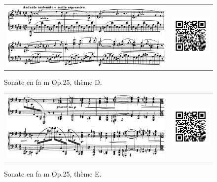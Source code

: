 \begin{figure}[!p]
  \begin{bigcenter}
    \begin{tabular}{lr}
      \includegraphics[width=12.5cm, keepaspectratio]{sonate-theme-D.png}
      &
      \includegraphics[width=3cm, keepaspectratio]{op1-qr.png}
    \end{tabular}
  \end{bigcenter}
  \caption{\label{sonate-theme-4}Sonate en fa m Op.25, thème D.}
\end{figure}

\begin{figure}[!p]
  \begin{bigcenter}
    \begin{tabular}{lr}
      \includegraphics[width=12.5cm, keepaspectratio]{sonate-theme-E.png}
      &
      \includegraphics[width=3cm, keepaspectratio]{op1-qr.png}
    \end{tabular}
  \end{bigcenter}
  \caption{\label{sonate-theme-5}Sonate en fa m Op.25, thème E.}
\end{figure}


